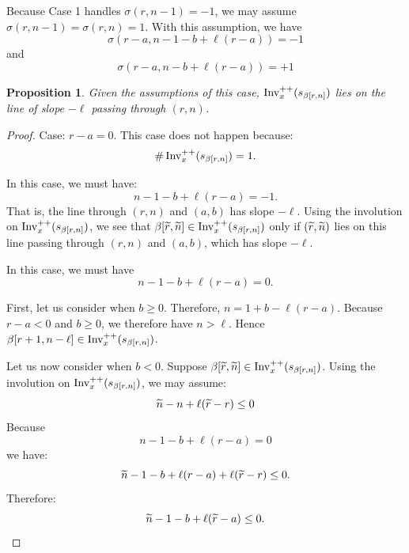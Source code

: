\documentclass[10pt]{amsart}
\newtheorem{prop}[theo]{Proposition}
\begin{document}
Because Case 1 handles $\sigma(r,n-1)=-1$, we may assume $\sigma(r,n-1) = \sigma(r,n) = 1$. With this assumption, we have
\begin{equation}\label{eq:44}
\sigma(r-a,n-1-b+\ell(r-a)) = -1
\end{equation}
and
\begin{equation}\label{eq:45}
\sigma(r-a,n-b+\ell(r-a)) = +1
\end{equation}

\begin{prop}\label{prop:inv-on-slope-of-neg-ell}
Given the assumptions of this case, $\operatorname{Inv}^{++}_x(s_{\beta[r,n]})$ lies on the line of slope $-\ell$ passing through $(r,n)$.
\end{prop}

\begin{proof}
{Case: $r- a = 0$.} This case does not happen because:
\begin{equation}\label{eq:106}
\#\Invplusplusx(s_{\beta[r,n]}) = 1.
\end{equation}

 In this case, we must have:
\begin{equation}\label{eq:46}
n-1-b+\ell(r-a) = -1.
\end{equation}
That is, the line through $(r,n)$ and $(a,b)$ has slope $-\ell$. Using the involution on $\operatorname{Inv}^{++}_x(s_{\beta[r,n]})$, we see that $\beta[\widetilde{r},\widetilde{n}] \in \operatorname{Inv}^{++}_x(s_{\beta[r,n]})$ only if $(\widetilde{r},\widetilde{n})$ lies on this line passing through $(r,n)$ and $(a,b)$, which has slope $-\ell$.

 In this case, we must have
\begin{equation}\label{eq:47}
n-1-b+\ell(r-a) = 0.
\end{equation}

First, let us consider when $b \geq 0$. Therefore, $n= 1+b - \ell(r-a)$. Because $r-a <0$ and $b \geq 0$, we therefore have $n > \ell$. Hence $\beta[r+1, n- \ell] \in \operatorname{Inv}^{++}_x(s_{\beta[r,n]})$.

Let us now consider when $b < 0$. Suppose $\beta[\widetilde{r},\widetilde{n}] \in \operatorname{Inv}^{++}_x(s_{\beta[r,n]})$. Using the involution on $\operatorname{Inv}^{++}_x(s_{\beta[r,n]})$, we may assume:
\begin{equation}\label{eq:92}
\tn - n + \ell(\tr -r) \leq 0
\end{equation}
Because
\begin{equation}\label{eq:93}
n-1-b+\ell(r-a) = 0
\end{equation}
we have:
\begin{equation}\label{eq:94}
\tn -1-b+\ell(r-a) + \ell(\tr -r) \leq 0.
\end{equation}
Therefore:
\begin{equation}\label{eq:95}
\tn -1-b+ \ell(\tr -a) \leq 0.
\end{equation}


\end{proof}
\end{document}
